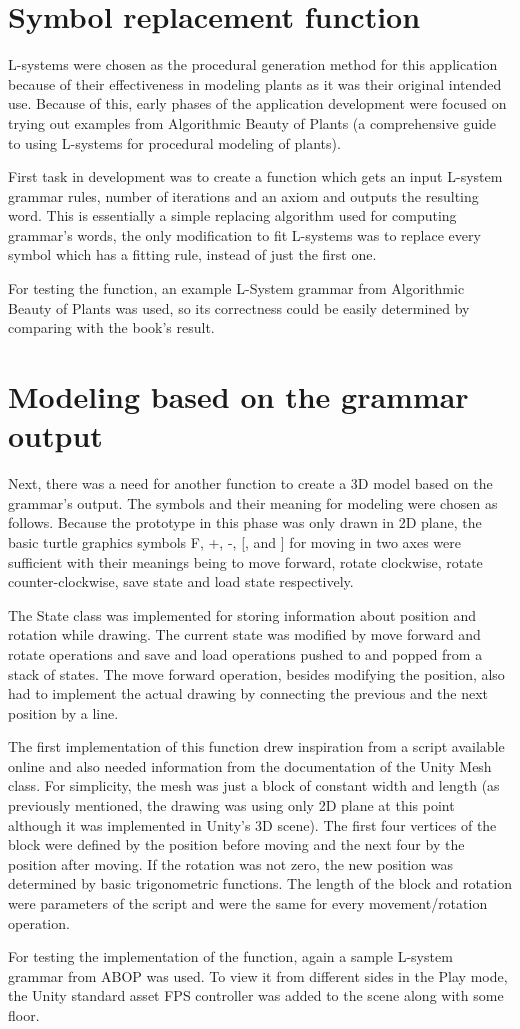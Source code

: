 \documentclass[
  digital, %
  table,   %
  nolof,     %
  nolot,     %
]{fithesis3}
\begin{document}
\section{Symbol replacement function}
L-systems were chosen as the procedural generation method for this application because of their effectiveness in modeling plants as it was their original intended use. Because of this, early phases of the application development were focused on trying out examples from Algorithmic Beauty of Plants (a comprehensive guide to using L-systems for procedural modeling of plants). \par
First task in development was to create a function which gets an input L-system grammar rules, number of iterations and an axiom and outputs the resulting word. This is essentially a simple replacing algorithm used for computing grammar's words, the only modification to fit L-systems was to replace every symbol which has a fitting rule, instead of just the first one. \par
For testing the function, an example L-System grammar from Algorithmic Beauty of Plants was used, so its correctness could be easily determined by comparing with the book's result. 
\section{Modeling based on the grammar output}
Next, there was a need for another function to create a 3D model based on the grammar's output. The symbols and their meaning for modeling were chosen as follows. Because the prototype in this phase was only drawn in 2D plane, the basic turtle graphics symbols F, +, -, [, and ] for moving in two axes were sufficient with their meanings being to move forward, rotate clockwise, rotate counter-clockwise, save state and load state respectively. \par
The State class was implemented for storing information about position and rotation while drawing. The current state was modified by move forward and rotate operations and save and load operations pushed to and popped from a stack of states. The move forward operation, besides modifying the position, also had to implement the actual drawing by connecting the previous and the next position by a line. \par
The first implementation of this function drew inspiration from a script available online and also needed information from the documentation of the Unity Mesh class. For simplicity, the mesh was just a block of constant width and length (as previously mentioned, the drawing was using only 2D plane at this point although it was implemented in Unity's 3D scene). The first four vertices of the block were defined by the position before moving and the next four by the position after moving. If the rotation was not zero, the new position was determined by basic trigonometric functions. The length of the block and rotation were parameters of the script and were the same for every movement/rotation operation. \par
For testing the implementation of the function, again a sample L-system grammar from ABOP was used. To view it from different sides in the Play mode, the Unity standard asset FPS controller was added to the scene along with some floor.
\end{document}
